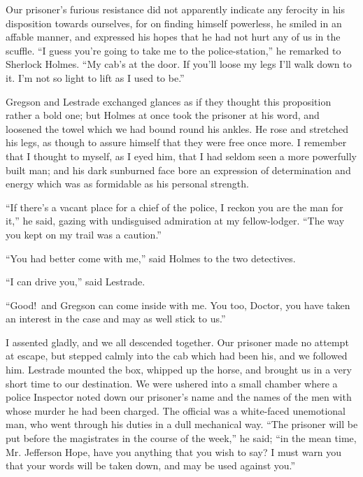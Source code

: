 \documentclass[12pt,english]{book}
\begin{document}


Our prisoner's furious resistance did not apparently indicate any
ferocity in his disposition towards ourselves, for on finding himself
powerless, he smiled in an affable manner, and expressed his hopes
that he had not hurt any of us in the scuffle. {}``I guess you're
going to take me to the police-station,'' he remarked to Sherlock
Holmes. {}``My cab's at the door. If you'll loose my legs I'll walk
down to it. I'm not so light to lift as I used to be.''

Gregson and Lestrade exchanged glances as if they thought this proposition
rather a bold one; but Holmes at once took the prisoner at his word,
and loosened the towel which we had bound round his ankles. He rose
and stretched his legs, as though to assure himself that they were
free once more. I remember that I thought to myself, as I eyed him,
that I had seldom seen a more powerfully built man; and his dark sunburned
face bore an expression of determination and energy which was as formidable
as his personal strength.

{}``If there's a vacant place for a chief of the police, I reckon
you are the man for it,'' he said, gazing with undisguised admiration
at my fellow-lodger. {}``The way you kept on my trail was a caution.''

{}``You had better come with me,'' said Holmes to the two detectives.

{}``I can drive you,'' said Lestrade.

{}``Good!\ and Gregson can come inside with me. You too, Doctor,
you have taken an interest in the case and may as well stick to us.''

I assented gladly, and we all descended together. Our prisoner made
no attempt at escape, but stepped calmly into the cab which had been
his, and we followed him. Lestrade mounted the box, whipped up the
horse, and brought us in a very short time to our destination. We
were ushered into a small chamber where a police Inspector noted down
our prisoner's name and the names of the men with whose murder he
had been charged. The official was a white-faced unemotional man,
who went through his duties in a dull mechanical way. {}``The prisoner
will be put before the magistrates in the course of the week,'' he
said; {}``in the mean time, Mr. Jefferson Hope, have you anything
that you wish to say? I must warn you that your words will be taken
down, and may be used against you.''
\end{document}
